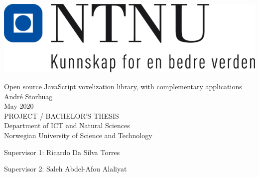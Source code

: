  
\thispagestyle{empty}
\includegraphics[scale=0.4]{fig/logo.png}
\mbox{}\\[6pc]
\begin{center}
\Huge{Open source JavaScript voxelization library, with complementary applications}\\[2pc]
 
\Large{André Storhuag}\\[1pc]
\large{May 2020}\\[2pc]
 
PROJECT / BACHELOR'S THESIS\\
Department of ICT and Natural Sciences\\
Norwegian University of Science and Technology
\end{center}
\vfill
 
\noindent Supervisor 1: Ricardo Da Silva Torres

\noindent Supervisor 2: Saleh Abdel-Afou Alaliyat
 